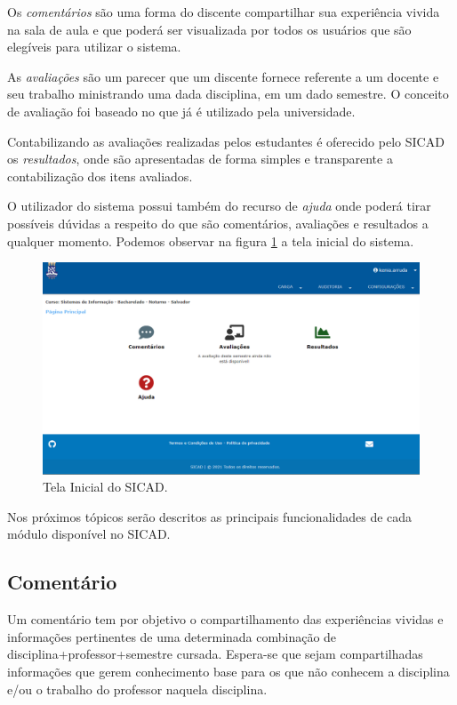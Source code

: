 \documentclass[12pt, a4paper]{report}
\begin{document}
Os \textit{comentários} são uma forma do discente compartilhar sua experiência vivida na sala de aula e que poderá ser visualizada por todos os usuários que são elegíveis para utilizar o sistema.

As \textit{avaliações} são um parecer que um discente fornece referente a um docente e seu trabalho ministrando uma dada disciplina, em um dado semestre. O conceito de avaliação foi baseado no que já é utilizado pela universidade.

Contabilizando as avaliações realizadas pelos estudantes é oferecido pelo \ac{SICAD} os \textit{resultados}, onde são apresentadas de forma simples e transparente a contabilização dos itens avaliados.

O utilizador do sistema possui também do recurso de \textit{ajuda} onde poderá tirar possíveis dúvidas a respeito do que são comentários, avaliações e resultados a qualquer momento. Podemos observar na figura \ref{fig:home_administrador} a tela inicial do sistema.
\begin{figure}
\centering
\includegraphics[scale=0.5]{home_administrador2.png}
\caption{Tela Inicial do SICAD.}
\label{fig:home_administrador}
\end{figure}

Nos próximos tópicos serão descritos as principais funcionalidades de cada módulo disponível no \ac{SICAD}.

\subsection{Comentário}
\label{subsec:comentario}
Um comentário tem por objetivo o compartilhamento das experiências vividas e informações pertinentes de uma determinada combinação de disciplina+professor+semestre cursada. Espera-se que sejam compartilhadas informações que gerem conhecimento base para os que não conhecem a disciplina e/ou o trabalho do professor naquela disciplina.
\end{document}
